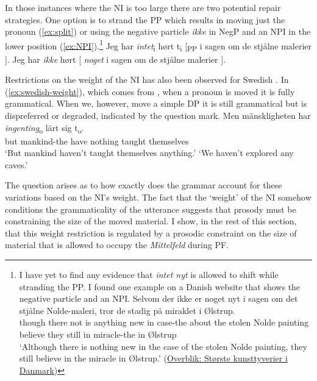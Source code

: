 \documentclass[12pt, letterpaper]{article}
\begin{document}
In those instances where the NI is too large there are two potential repair strategies. One option is to strand the PP which results in moving just the pronoun (\ref{ex:split}) or using the negative particle \textit{ikke} in NegP and an NPI in the lower position (\ref{ex:NPI}).\footnote{I have yet to find any evidence that \emph{intet nyt} is allowed to shift while stranding the PP. I found one example on a Danish website that shows the negative particle and an NPI. 
\ea
\gll Selvom der ikke er noget nyt i sagen om det stjålne Nolde-maleri, tror de stadig på miraklet i Ølstrup.\\
though there not is anything new in case-the about the stolen {Nolde painting} believe they still in miracle-the in Ølstrup\\
\glt `Although there is nothing new in the case of the stolen Nolde painting, they still believe in the miracle in Ølstrup.' \hfill (\href{https://www.tvmidtvest.dk/midt-og-vestjylland/overblik-storste-kunsttyverier-i-danmark}{Overblik: Største kunsttyverier i Danmark})
\z 
  }
	\ea 
		\ea Jeg har \textit{intet}\textsubscript{i} hørt t\textsubscript{i} [\textsubscript{PP} i sagen om de stjålne malerier ]. \label{ex:split}
		\ex Jeg har \textit{ikke} hørt [ \textit{noget} i sagen om de stjålne malerier ]. \label{ex:NPI}
		\z 
	\z  

Restrictions on the weight of the NI has also been observed for Swedish \citep{penkaNegativeIndefinites2011}. In (\ref{ex:swedish-weight}), which comes from \citet{penkaNegativeIndefinites2011}, when a pronoun is moved it is fully grammatical. When we, however, move a simple DP it is still grammatical but is dispreferred or degraded, indicated by the question mark. 
	\ea \label{ex:swedish-weight}
		\ea 
		\gll Men mänskligheten har \textit{ingenting}\textsubscript{o} lärt sig t\textsubscript{o}.\\
		but mankind-the have nothing taught themselves\\
		\glt `But mankind haven't taught themselves anything.'
		\glt `We haven't explored any caves.'
		\z 
	\z 

The question arises as to how exactly does the grammar account for these variations based on the NI's weight. The fact that the `weight' of the NI somehow conditions the grammaticality of the utterance suggests that prosody must be constraining the size of the moved material. I show, in the rest of this section, that this weight restriction is regulated by a prosodic constraint on the size of material that is allowed to occupy the \emph{Mittelfeld} during PF. 
\end{document}
